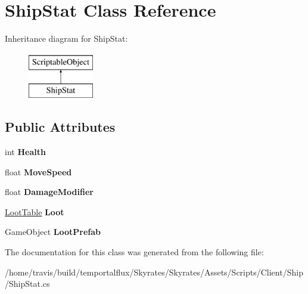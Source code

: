 \hypertarget{class_ship_stat}{\section{Ship\-Stat Class Reference}
\label{class_ship_stat}
}
Inheritance diagram for Ship\-Stat\-:\begin{figure}[H]
\begin{center}
\leavevmode
\includegraphics[height=2.000000cm]{class_ship_stat}
\end{center}
\end{figure}
\subsection*{Public Attributes}
\begin{DoxyCompactItemize}
\item 
\hypertarget{class_ship_stat_ab29fff973cecbe0c852a67b70a41bce7}{int {\bfseries Health}}\label{class_ship_stat_ab29fff973cecbe0c852a67b70a41bce7}

\item 
\hypertarget{class_ship_stat_a5eb3933b4e82d370adf8fe3b781b3f5e}{float {\bfseries Move\-Speed}}\label{class_ship_stat_a5eb3933b4e82d370adf8fe3b781b3f5e}

\item 
\hypertarget{class_ship_stat_af6fce7bb672881aa282ca755540f28d1}{float {\bfseries Damage\-Modifier}}\label{class_ship_stat_af6fce7bb672881aa282ca755540f28d1}

\item 
\hypertarget{class_ship_stat_a5c1c8d0ae16df851e395e157bb53d45a}{\hyperlink{class_skyrates_1_1_client_1_1_loot_1_1_loot_table}{Loot\-Table} {\bfseries Loot}}\label{class_ship_stat_a5c1c8d0ae16df851e395e157bb53d45a}

\item 
\hypertarget{class_ship_stat_a8061dc83b91d2113ddc1cc86c72a50cd}{Game\-Object {\bfseries Loot\-Prefab}}\label{class_ship_stat_a8061dc83b91d2113ddc1cc86c72a50cd}

\end{DoxyCompactItemize}


The documentation for this class was generated from the following file\-:\begin{DoxyCompactItemize}
\item 
/home/travis/build/temportalflux/\-Skyrates/\-Skyrates/\-Assets/\-Scripts/\-Client/\-Ship/Ship\-Stat.\-cs\end{DoxyCompactItemize}
